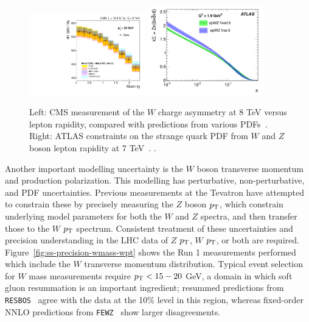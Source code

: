 \begin{figure}[p]
    \centering
    \includegraphics[width=0.45\textwidth]{figures/ss-precision-wmass-wasymmetry.pdf}
    \includegraphics[width=0.45\textwidth]{figures/ss-precision-wmass-wzratio.pdf}
    \caption{
    Left: CMS measurement of the $W$ charge asymmetry at 8 TeV versus lepton
    rapidity, compared with predictions from various PDFs~\cite{Khachatryan:2016pev}.
    Right:  ATLAS constraints on the strange quark PDF from $W$ and $Z$ boson lepton rapidity at 7 TeV~\cite{Aad:2012sb}. 
    .}
    \label{fig:ss-precision-wmass-pdf}
\end{figure}

Another important modelling uncertainty is the $W$ boson transverse
momentum and production polarization.  This modelling has
perturbative, non-perturbative, and PDF uncertainties. Previous
measurements at the Tevatron have attempted to constrain these by
precisely measuring the $Z$ boson $p_{\mathrm{T}}$, which constrain underlying
model parameters for both the $W$ and $Z$ spectra, and then transfer
those to the $W$ $p_{\mathrm{T}}$ spectrum.  Consistent treatment of these
uncertainties and precision understanding in the LHC data of $Z$
$p_{\mathrm{T}}$, $W$ $p_{\mathrm{T}}$, or both are required.
Figure~\ref{fig:ss-precision-wmass-wpt} shows the Run 1 measurements
performed which include the $W$ transverse momentum distribution.
Typical event selection for $W$ mass measurements require $p_{\mathrm{T}} <
15-20$ GeV, a domain in which soft gluon resummation is an important
ingredient; resummed predictions from \texttt{RESBOS}~\cite{Ladinsky:1993zn,Landry:2002ix,Guzzi:2013aja}
agree with the data at the 10\% level in this region, whereas
fixed-order NNLO predictions from
\texttt{FEWZ}~\cite{Melnikov:2006kv,Gavin:2010az,Gavin:2012sy,Li:2012wna} show larger
disagreements.


